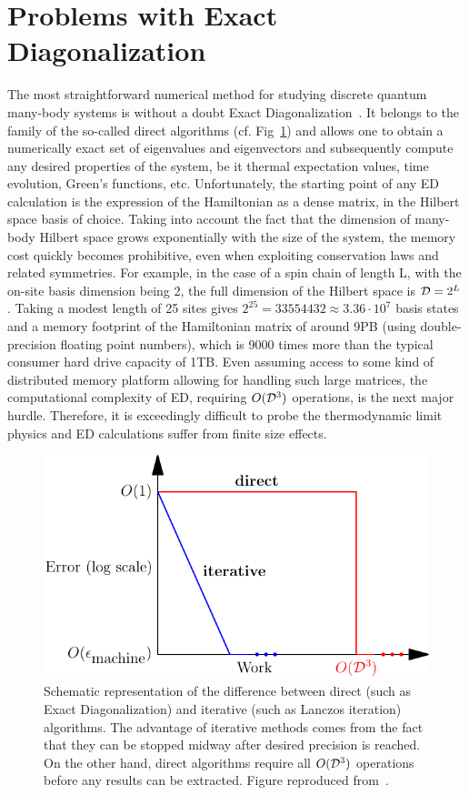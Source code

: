 \section{Problems with Exact Diagonalization}
The most straightforward numerical method for studying discrete quantum many-body systems is without a doubt
Exact Diagonalization~\autocite{Weisse2008}. It belongs to the family of the so-called direct algorithms (cf. Fig~\ref{fig:direct_iter})
and allows one to obtain a numerically exact set of eigenvalues and eigenvectors and subsequently compute any desired properties
of the system, be it thermal expectation values, time evolution, Green's functions, etc. Unfortunately, the starting point of any
ED calculation is the expression of the Hamiltonian as a dense matrix, in the Hilbert space basis of choice. Taking into account
the fact that the dimension of many-body Hilbert space grows exponentially with the size of the system, the memory cost quickly becomes
prohibitive, even when exploiting conservation laws and related symmetries. For example, in the case of a spin chain of length L, with
the on-site basis dimension being 2, the full dimension of the Hilbert space is \(\mathcal{D} = 2^{L}\). Taking a modest length of 25 sites gives
\(2^{25} = 33554432\approx 3.36 \cdot 10^7\) basis states and a memory footprint of the Hamiltonian matrix of around 9PB (using double-precision
floating point numbers), which is 9000 times more than the typical consumer hard drive capacity of 1TB. Even assuming access to some kind of distributed
memory platform allowing for handling such large matrices, the computational complexity of ED, requiring \(O(\mathcal{D}^3)\) operations,
is the next major hurdle. Therefore, it is exceedingly
difficult to probe the thermodynamic limit physics and ED calculations suffer from finite size effects.
\begin{figure}[htbp]
	\centering
	\includegraphics[width=0.75\linewidth]{Figures/direct_iterative.pdf}
	\caption{Schematic representation of the difference between direct (such as Exact Diagonalization) and
		iterative (such as Lanczos iteration) algorithms. The advantage of iterative methods comes from the fact that they
		can be stopped midway after desired precision is reached. On the other hand, direct algorithms require all \(O(\mathcal{D}^3)\)
		operations before any results can be extracted. Figure reproduced from~\textcite{Trefethen1997}.}
	\label{fig:direct_iter}
\end{figure}

